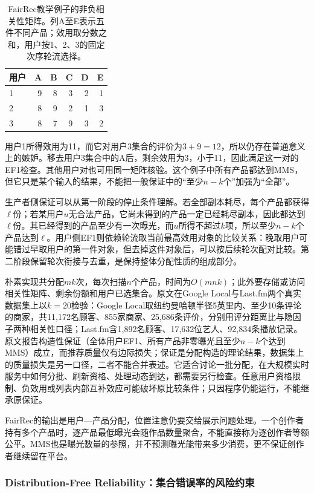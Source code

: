 \begin{table}[htbp]
 \centering
 \small
 \begin{tabular}{@{}lrrrrr@{}}
  \toprule
  用户 & A & B & C & D & E \\
  \midrule
  1 & 9 & 8 & 3 & 2 & 1 \\
  2 & 8 & 9 & 2 & 1 & 3 \\
  3 & 8 & 7 & 9 & 3 & 2 \\
  \bottomrule
 \end{tabular}
 \caption{FairRec教学例子的非负相关性矩阵。列A至E表示五件不同产品；效用取分数之和，用户按1、2、3的固定次序轮流选择。}
 \label{tab:rs-fairrec-example}
\end{table}

用户1所得效用为11，而它对用户3集合的评价为$3+9=12$，所以仍存在普通意义上的嫉妒。移去用户3集合中的A后，剩余效用为3，小于11，因此满足这一对的EF1检查。其他用户对也可用同一矩阵核验。这个例子中所有产品都达到MMS，但它只是某个输入的结果，不能把一般保证中的“至少$n-k$个”加强为“全部”。

生产者侧保证可以从第一阶段的停止条件理解。若全部副本耗尽，每个产品都获得$\ell$份；若某用户$u$无合法产品，它尚未得到的产品一定已经耗尽副本，因此都达到$\ell$份。其已经得到的产品至少有一次曝光，而$u$所得不超过$k$项，所以至少$n-k$个产品达到$\ell$。用户侧EF1则依赖轮流取当前最高效用对象的比较关系：晚取用户可能错过早取用户的第一件对象，但去掉这件对象后，可以按后续轮次配对比较。第二阶段保留轮次衔接与去重，是保持整体分配性质的组成部分。

朴素实现共分配$mk$次，每次扫描$n$个产品，时间为$O(mnk)$；此外要存储或访问相关性矩阵、剩余份额和用户已选集合。原文在Google Local与Last.fm两个真实数据集上以$k=20$检验：Google Local取纽约曼哈顿半径5英里内、至少10条评论的商家，共11,172名顾客、855家商家、25,686条评价，分别用评分距离比与隐因子两种相关性口径；Last.fm含1,892名顾客、17,632位艺人、92,834条播放记录。原文报告构造性保证（全体用户EF1、所有产品非零曝光且至少$n-k$个达到MMS）成立，而推荐质量仅有边际损失；保证是分配构造的理论结果，数据集上的质量损失是另一口径，二者不能合并表述。它适合讨论一批分配，在大规模实时服务中如何分批、刷新资格、处理动态到达，都需要另行检查。任意用户资格限制、负效用或列表内部互补效应可能破坏原比较条件；只因程序仍能运行，不能继承原保证。

FairRec的输出是用户—产品分配，位置注意仍要交给展示问题处理。一个创作者持有多个产品时，逐产品最低曝光会随作品数量聚合，不能直接称为逐创作者等额公平。MMS也是曝光数量的参照，并不预测曝光能带来多少消费，更不保证创作者继续留在平台。

\subsubsection{Distribution-Free Reliability：集合错误率的风险约束}
\label{sec:rs-distribution-free-reliability}

